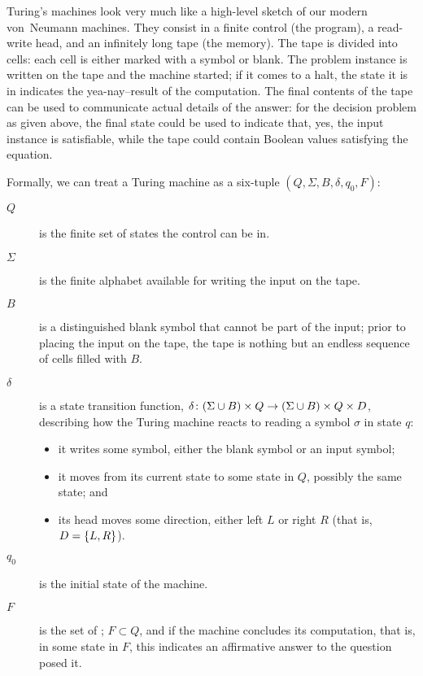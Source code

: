 Turing's machines look very much like a high-level sketch of our modern von~Neumann machines. They consist in a finite control (the program), a read-write head, and an infinitely long tape (the memory). The tape is divided into cells: each cell is either marked with a symbol or blank. The problem instance is written on the tape and the machine started; if it comes to a halt, the state it is in indicates the yea-nay--result of the computation. The final contents of the tape can be used to communicate actual details of the answer: for the decision problem as given above, the final state could be used to indicate that, yes, the input instance is satisfiable, while the tape could contain Boolean values satisfying the equation.

Formally, we can treat a Turing machine as a six-tuple $(Q, \Sigma, B, \delta, q_{0}, F)$:
\begin{description} %
\item[\MakeUppercase{$Q$}] is the finite set of states the control can be in.
\item[$\Sigma$] is the finite alphabet available for writing the input on the tape.
\item[\MakeUppercase{$B$}] is a distinguished blank symbol that cannot be part of the input; prior to placing the input on the tape, the tape is nothing but an endless sequence of cells filled with $B$.
\item[$\delta$] is a state transition function, $\delta\colon (\Sigma \cup B) \times Q \to (\Sigma \cup B) \times Q \times D$, describing how the Turing machine reacts to reading a symbol $\sigma$ in state $q$: %
\begin{itemize}
\item it writes some symbol, either the blank symbol or an input symbol; 
\item it moves from its current state to some state in $Q$, possibly the same state; and
\item its head moves some direction, either left $L$ or right $R$ (that is, $D = \left\{ L, R \right\}$).
\end{itemize}
\item[$q_{0}$] is the initial state of the machine.
\item[\MakeUppercase{$F$}] is the set of ; $F \subset Q$, and if the machine concludes its computation, that is,  in some state in $F$, this indicates an affirmative answer to the question posed it. %
\end{description}

